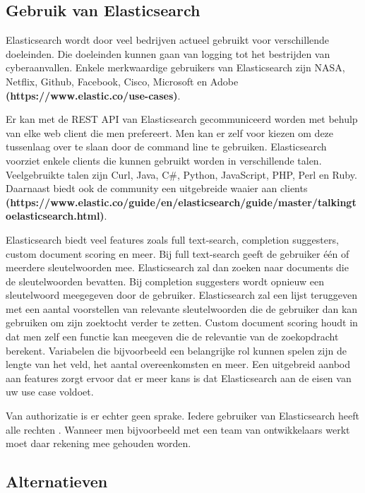 \subsection{Gebruik van Elasticsearch}

Elasticsearch wordt door veel bedrijven actueel gebruikt voor verschillende doeleinden. Die doeleinden kunnen gaan van logging tot het bestrijden van cyberaanvallen. Enkele merkwaardige gebruikers van Elasticsearch zijn NASA, Netflix, Github, Facebook, Cisco, Microsoft en Adobe \textbf{(https://www.elastic.co/use-cases)}.

Er kan met de REST API van Elasticsearch gecommuniceerd worden met behulp van elke web client die men prefereert. Men kan er zelf voor kiezen om deze tussenlaag over te slaan door de command line te gebruiken. Elasticsearch voorziet enkele clients die kunnen gebruikt worden in verschillende talen. Veelgebruikte talen zijn Curl, Java, C\#, Python, JavaScript, PHP, Perl en Ruby. Daarnaast biedt ook de community een uitgebreide waaier aan clients \textbf{(https://www.elastic.co/guide/en/elasticsearch/guide/master/\textunderscore talking\textunderscore to\textunderscore elasticsearch.html)}.

Elasticsearch biedt veel features zoals full text-search, completion suggesters, custom document scoring en meer. Bij full text-search geeft de gebruiker één of meerdere sleutelwoorden mee. Elasticsearch zal dan zoeken naar documents die de sleutelwoorden bevatten. Bij completion suggesters wordt opnieuw een sleutelwoord meegegeven door de gebruiker. Elasticsearch zal een lijst teruggeven met een aantal voorstellen van relevante sleutelwoorden die de gebruiker dan kan gebruiken om zijn zoektocht verder te zetten. Custom document scoring houdt in dat men zelf een functie kan meegeven die de relevantie van de zoekopdracht berekent. Variabelen die bijvoorbeeld een belangrijke rol kunnen spelen zijn de lengte van het veld, het aantal overeenkomsten en meer. Een uitgebreid aanbod aan features zorgt ervoor dat er meer kans is dat Elasticsearch aan de eisen van uw use case voldoet. 

Van authorizatie is er echter geen sprake. Iedere gebruiker van Elasticsearch heeft alle rechten \autocite{Brasetvik2013}. Wanneer men bijvoorbeeld met een team van ontwikkelaars werkt moet daar rekening mee gehouden worden.

\subsection{Alternatieven}

